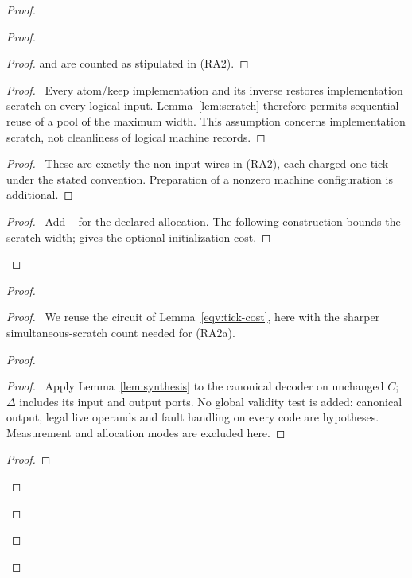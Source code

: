 \begin{proof}
\begin{proof}
\begin{proof}
 and are counted as stipulated in (RA2).\end{proof}
 \begin{proof}\pf\ Every atom/keep implementation and its inverse
 restores implementation scratch on every logical input.
 Lemma~\ref{lem:scratch} therefore permits sequential reuse of
 a pool of the maximum width. This assumption concerns
 implementation scratch, not cleanliness of logical machine records.
 \end{proof}
 \begin{proof}\pf\ These are exactly the non-input wires in (RA2),
 each charged one tick under the stated convention. Preparation of
 a nonzero machine configuration is additional.\end{proof}
 \qedstep
 \begin{proof}\pf\ Add --
 for the declared allocation. The following construction bounds the
 scratch width;  gives the optional
 initialization cost.\end{proof}
\end{proof}
 \begin{proof}
  \begin{proof}
   \pf\ We reuse the circuit of Lemma~\ref{eqv:tick-cost}, here with the
   sharper simultaneous-scratch count needed for (RA2a).
\begin{proof}
 \begin{proof}\pf\ Apply Lemma~\ref{lem:synthesis} to the canonical
 decoder on unchanged $C$; $\Delta$ includes its input and output
 ports. No global validity test is added: canonical output, legal
 live operands and fault handling on every code are hypotheses.
 Measurement and allocation modes are excluded here.\end{proof}
 \begin{proof}

\end{proof}
\end{proof}
\end{proof}
\end{proof}
\end{proof}
